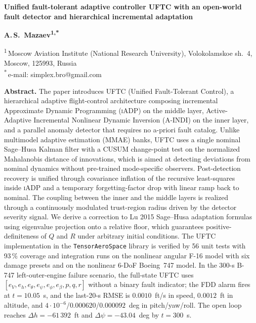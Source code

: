 \documentclass[a4paper,14pt]{extarticle}
\newcommand{\UFTC}{\textsc{UFTC}}
\newcommand{\IADP}{\textsc{iADP}}
\newcommand{\AINDI}{\textsc{A-INDI}}
\begin{document}
\bigskip

\noindent\textbf{Unified fault-tolerant adaptive controller UFTC with an open-world fault detector and hierarchical incremental adaptation}

\smallskip
\noindent\textbf{A.\,S.~Mazaev\textsuperscript{1,*}}

\smallskip
\noindent
\small
\textsuperscript{1}\,Moscow Aviation Institute (National Research University), Volokolamskoe sh.\ 4, Moscow, 125993, Russia \\
\textsuperscript{*}\,e-mail: simplex.bro@gmail.com

\medskip
\noindent\textbf{Abstract.}
The paper introduces \UFTC{} (Unified Fault-Tolerant Control), a hierarchical adaptive flight-control architecture composing incremental Approximate Dynamic Programming (\IADP{}) on the middle layer, Active-Adaptive Incremental Nonlinear Dynamic Inversion (\AINDI{}) on the inner layer, and a parallel anomaly detector that requires no a-priori fault catalog. Unlike multimodel adaptive estimation (MMAE) banks, \UFTC{} uses a single nominal Sage--Husa Kalman filter with a CUSUM change-point test on the normalized Mahalanobis distance of innovations, which is aimed at detecting deviations from nominal dynamics without pre-trained mode-specific observers. Post-detection recovery is unified through covariance inflation of the recursive least-squares inside \IADP{} and a temporary forgetting-factor drop with linear ramp back to nominal. The coupling between the inner and the middle layers is realized through a continuously modulated trust-region radius driven by the detector severity signal. We derive a correction to Lu 2015 Sage--Husa adaptation formulas using eigenvalue projection onto a relative floor, which guarantees positive-definiteness of $Q$ and $R$ under arbitrary initial conditions. The \UFTC{} implementation in the \texttt{TensorAeroSpace} library is verified by 56 unit tests with 93\,\% coverage and integration runs on the nonlinear angular F-16 model with six damage presets and on the nonlinear 6-DoF Boeing~747 model. In the 300-s B-747 left-outer-engine failure scenario, the full-state \UFTC{} uses $[e_V,e_h,e_{\theta},e_{\psi},e_{\phi},e_{\beta},p,q,r]$ without a binary fault indicator; the FDD alarm fires at $t=10.05$~s, and the last-20-s RMSE is $0.0010$~ft/s in speed, $0.0012$~ft in altitude, and $4\cdot10^{-6}$/$0.000620$/$0.000092$~deg in pitch/yaw/roll. The open loop reaches $\Delta h=-61\,392$~ft and $\Delta\psi=-43.04$~deg by $t=300$~s.
\end{document}
